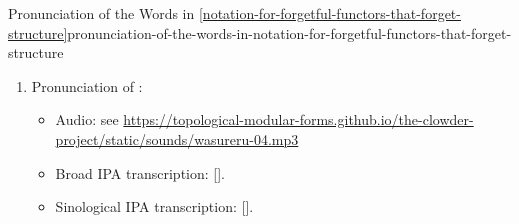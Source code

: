 \begin{remark}{Pronunciation of the Words in \cref{notation-for-forgetful-functors-that-forget-structure}}{pronunciation-of-the-words-in-notation-for-forgetful-functors-that-forget-structure}
\begin{enumerate}
            \begin{itemize}
                    <li>Audio: <audio id="audioPlayerWasureru3" src="/static/sounds/wasureru-03.ogg" type="audio/ogg"></audio><span class="dark-svg"><button id="playButtonWasureru3"></button></span>
                \item Audio: see \url{https://topological-modular-forms.github.io/the-clowder-project/static/sounds/wasureru-03.ogg}
                \item Broad IPA transcription: [].
                \item Sinological IPA transcription: [].
            \end{itemize}
        \item\label{pronunciation-of-the-words-in-notation-for-forgetful-functors-that-forget-structure-yiwang-hanzi}Pronunciation of :
            \begin{itemize}
                    <li>Audio: <audio id="audioPlayerWasureru4" src="/static/sounds/wasureru-04.mp3" type="audio/mp3"></audio><span class="dark-svg"><button id="playButtonWasureru4"></button></span>
                \item Audio: see \url{https://topological-modular-forms.github.io/the-clowder-project/static/sounds/wasureru-04.mp3}
                \item Broad IPA transcription: [].
                \item Sinological IPA transcription: [].
            \end{itemize}
    \end{enumerate}
\end{remark}
